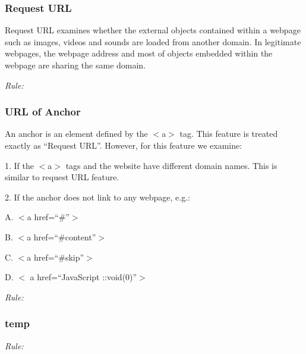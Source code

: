 \documentclass[twocolumn,10pt]{article}
\begin{document}
\subsubsection{Request URL}

Request URL examines whether the external objects contained within a webpage such as images, videos and sounds are loaded from another domain. In legitimate webpages, the webpage address and most of objects embedded within the webpage are sharing the same domain. 
\begin{center}
\it Rule:
\end{center}
\subsubsection{URL of Anchor}

An anchor is an element defined by the $ < $a$ > $ tag. This feature is treated exactly as “Request URL”. However, for this feature we examine:

1. If the $ < $a$ > $ tags and the website have different domain names. This is similar to request URL feature. 

2. If the anchor does not link to any webpage, e.g.:

A. $<$a href=“\#”$>$

B. $<$a href=“\#content”$>$

C. $<$a href=“\#skip”$>$

D. $<$ a href=“JavaScript ::void(0)”$>$
\begin{center}
\it Rule:
\end{center}
\subsubsection{temp}
\begin{center}
	\it Rule:
\end{center}%
\end{document}
